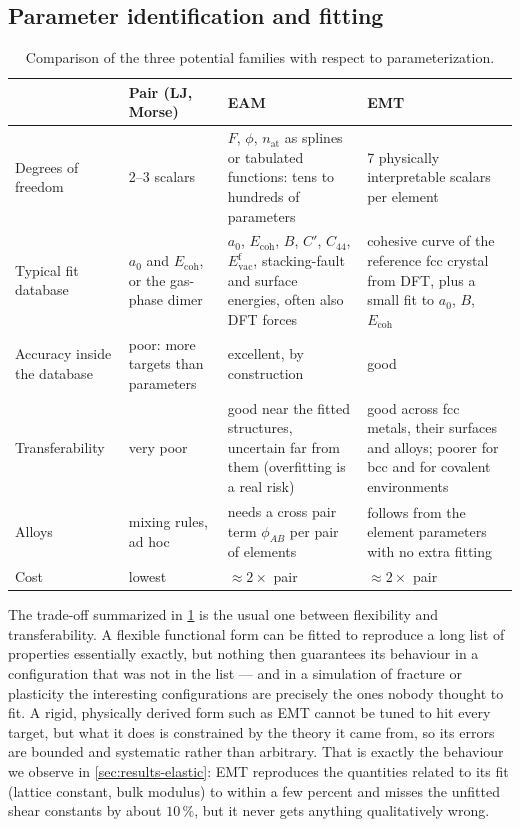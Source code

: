 \documentclass[11pt,a4paper]{article}
\numberwithin{equation}{section}
\theoremstyle{remark}
\begin{document}
\subsection{Parameter identification and fitting}\label{sec:fitting}

\begin{table}[ht]
  \centering
  \caption{Comparison of the three potential families with respect to parameterization.}
  \label{tab:fitting}
  \begin{tabularx}{\linewidth}{lXXX}
    \toprule
     & Pair (LJ, Morse) & EAM & EMT \\
    \midrule
    Degrees of freedom
      & 2--3 scalars
      & $F$, $\phi$, $n_{\mathrm{at}}$ as splines or tabulated functions: tens to hundreds of
        parameters
      & 7 physically interpretable scalars per element \\
    Typical fit database
      & $a_0$ and $E_{\mathrm{coh}}$, or the gas-phase dimer
      & $a_0$, $E_{\mathrm{coh}}$, $B$, $C'$, $C_{44}$, $E^{\mathrm{f}}_{\mathrm{vac}}$, stacking-fault
        and surface energies, often also DFT forces
      & cohesive curve of the reference fcc crystal from DFT, plus a small fit to $a_0$, $B$,
        $E_{\mathrm{coh}}$ \\
    Accuracy inside the database
      & poor: more targets than parameters
      & excellent, by construction
      & good \\
    Transferability
      & very poor
      & good near the fitted structures, uncertain far from them (overfitting is a real risk)
      & good across fcc metals, their surfaces and alloys; poorer for bcc and for covalent
        environments \\
    Alloys
      & mixing rules, ad hoc
      & needs a cross pair term $\phi_{AB}$ per pair of elements
      & follows from the element parameters with no extra fitting \\
    Cost
      & lowest
      & $\approx2\times$ pair
      & $\approx2\times$ pair \\
    \bottomrule
  \end{tabularx}
\end{table}

The trade-off summarized in \cref{tab:fitting} is the usual one between flexibility and
transferability. A flexible functional form can be fitted to reproduce a long list of properties
essentially exactly, but nothing then guarantees its behaviour in a configuration that was not in the
list --- and in a simulation of fracture or plasticity the interesting configurations are precisely the
ones nobody thought to fit. A rigid, physically derived form such as EMT cannot be tuned to hit every
target, but what it does is constrained by the theory it came from, so its errors are bounded and
systematic rather than arbitrary. That is exactly the behaviour we observe in
\cref{sec:results-elastic}: EMT reproduces the quantities related to its fit (lattice constant, bulk
modulus) to within a few percent and misses the unfitted shear constants by about $10\,\%$, but it
never gets anything qualitatively wrong.
\end{document}
